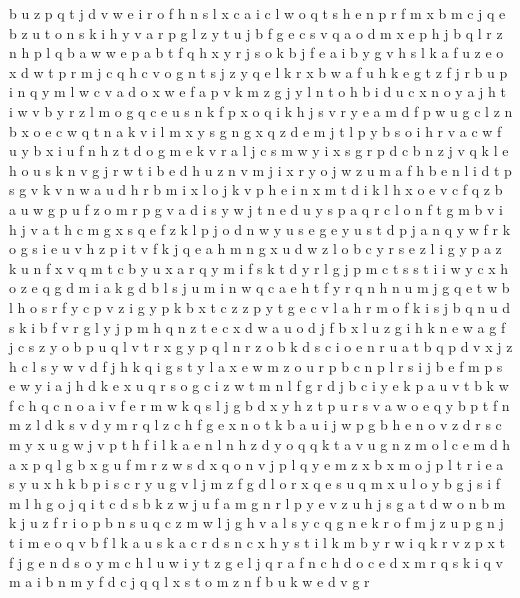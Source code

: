 \documentclass{article}
\begin{document}
b u z p q t j d v w e i r o f h n s l x c a
i c l w o q t s h e n p r f m x b
m c j q e b z u t o n s k i h y v a r p g l
z y t u j b f g e c s v q a o d m x
e p h j b q l
r z n h p l q b a w
w e p a b t f q h x y r j s o k
b j f e a
i b y g v h s l k a f u z e o x d w t p r m j c q
h c v o g n t s j z y q e l k r x b w a f u
h k e g t z f j r b u p i n q y m l w c v a d o x
w e f a p v k m z g j y l n t o h b i d u c
x n o y
a j h t i w v b y r z l m o g q c e u s n k f p x
o q i k h j s v r y e a m d f p w u g c l z n b x
o e c w q t n a k v i l m x y s g
n g x q z d e m j t l p y b s o i h r v a c w f u
y b x i u f n h z t d o g m e k v r a l j c s
m w y i x s g r p d c b n z j v q k l e h o u
s k n v g j r w t i b e
d h u z n v m j i
x r y o j w z u m a f h b e n l i d t p s g v k
v n w a u d h r b m i x l o j k
v p h e i n x
m t d i k l h x o e v c f q z b a u w g p
u f z o m r p g v a d i s y w j t n
e d u y s p a q r c l o n f t g m b v i h j
v a t h c m g x s q e f z k l p j o d n w y u
s e
g e y u s
t d p j a n q y w f r k o g s i e u v h z
p i t v f k j q e a h m n g x u d w z l o b c y r s
e z l i g y
p a z k u n f x v q m t c b y
u x a r q y m i f s k t d
y r l g j p m c t s
s t i
i w y c x h o z e q g
d m i a
k g d b l s j u m i n w q c a e h t f y
r q n h
n u m j g q e t w b l h o s r f y c p v z
i g y p k b x t c z
z p y t g e c v l a h r m o f k i s j b q n u d
s k i b f v r g l y j p m h q n z t e c x d w a u o
d j f b x l u z g i
h k n e w a g f j c s z y o b p u q l v t r x
g y p q l n r z o b k d s c i
o e n r u a t b q p d v x j z h c l s y w
v d f j h k q i g s t y l a x e w m z o u r p b c n
p l r s i j b e f
m p s e w y i a j
h d k e x u q r s o g c i z w t m n l
f g r d j b c i y e k p a
u v t b k w f c h q
c n o a i v f e r m w k q s l j g b d x y h z t p u
r s v a w o e q y b p t f n m z l d k
s v d y m r q l z c h f g e x n o t k b a u i j w p
g b h e n o v
z d r s c m y x u g w j v p t h f i l k a e n
l n h z d y o q
q k t a v u g n z m o l
c e m d h a x p q l g
b
x g
u f m r z w s d x q o n v j p l
q y e m z x
b x m o j p l t r i e a s y u
x h k b p i s c r y u g v l j m z
f g d l o r x q e s u
q m x u l o y b g j s
i f m l h g o j
q
i t c d s b k z w j u f a m g n r l p y e v
z u h j
s g a t d w o n b m k j u z f r
i o p b n s u q c z m w l j g h v
a l s y c q g n e k r o f m j z u p
g n j t i m e o q v b f l k a u s
k a c r
d s n c x h y
s t i l k m b y r w
i q k r v z p x t f j g e n d s o y m c h l u w
i y t z g e l j q r a f n c h d o
c e d x m r q s k
i q v m a
i b n m y f d c
j q
q l x s t o m z n f b u k w e d v g r
\end{document}
